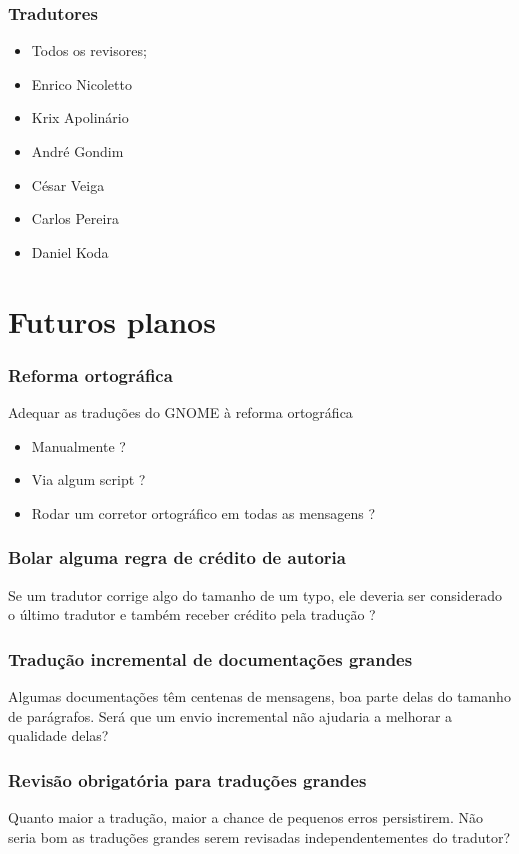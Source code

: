 \documentclass{beamer}
\begin{document}
\begin{frame}[fragile]
    \frametitle{Tradutores}
    \begin{itemize}
        \item Todos os revisores;
        \item Enrico Nicoletto
        \item Krix Apolinário
        \item André Gondim
        \item César Veiga
        \item Carlos Pereira
        \item Daniel Koda
    \end{itemize}
\end{frame}
\section{Futuros planos}

\begin{frame}
    \frametitle{Reforma ortográfica}

    Adequar as traduções do GNOME à reforma ortográfica
    \begin{itemize}[<+->]
        \item Manualmente ? 
        \item Via algum script ?
        \item Rodar um corretor ortográfico em todas as mensagens ?  
    \end{itemize}
\end{frame}

\begin{frame}
    \frametitle{Bolar alguma regra de crédito de autoria}
    Se um tradutor corrige algo do tamanho de um typo, ele deveria ser considerado o último tradutor e também receber crédito pela tradução ? 
\end{frame}

\begin{frame}
    \frametitle{Tradução incremental de documentações grandes}
    Algumas documentações têm centenas de mensagens, boa parte delas do tamanho de parágrafos. 
    Será que um envio incremental não ajudaria a melhorar a qualidade delas?
\end{frame}

\begin{frame}
    \frametitle{Revisão obrigatória para traduções grandes}
    Quanto maior a tradução, maior a chance de pequenos erros persistirem. 
    Não seria bom as traduções grandes serem revisadas independentementes do tradutor?
\end{frame}
\end{document}
